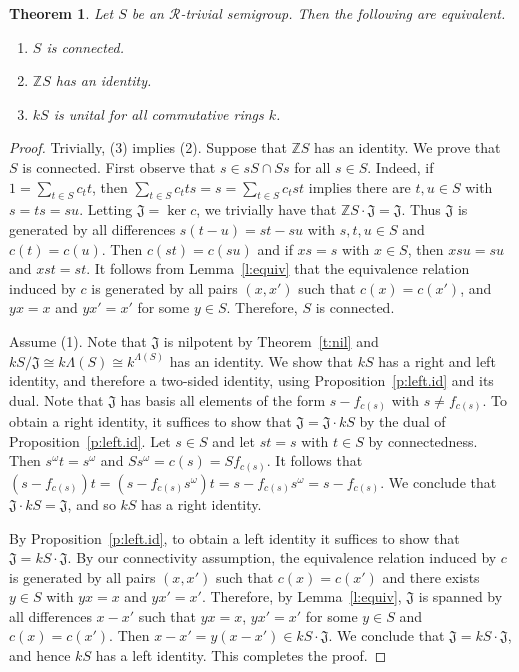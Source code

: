 \documentclass[reqno,11pt]{amsart}
\newcommand{\R}{\mathrel{\mathscr R}} %
\newtheorem{Thm}{Theorem}[section]
\numberwithin{equation}{section}
\begin{document}
\begin{Thm}\label{t:right.connected}
Let $S$ be an $\R$-trivial semigroup.  Then the following are equivalent.
\begin{enumerate}
    \item $S$ is connected.
    \item $\mathbb ZS$ has an identity.
    \item $kS$ is unital for all commutative rings $k$.
\end{enumerate}
\end{Thm}
\begin{proof}
Trivially, (3) implies (2).  Suppose that $\mathbb ZS$ has an identity.   We prove that $S$ is  connected. First observe that $s\in sS\cap Ss$ for all $s\in S$.  Indeed, if $1=\sum_{t\in S}c_tt$, then $\sum_{t\in S}c_tts=s=\sum_{t\in S}c_tst$ implies there are $t,u\in S$ with $s=ts=su$.   Letting $\mathfrak J=\ker c$, we trivially have that $\mathbb ZS\cdot \mathfrak J = \mathfrak J$. %
Thus $\mathfrak J$ is generated by all differences $s(t-u)=st-su$ with $s,t,u\in S$ and $c(t)=c(u)$. Then $c(st)=c(su)$ and if $xs=s$ with $x\in S$, then $xsu= su$ and $xst=st$.
  It follows from Lemma~\ref{l:equiv} that the equivalence relation induced by $c$ is generated by all pairs $(x,x')$ such that $c(x)=c(x')$, and $yx=x$ and $yx'=x'$ for some $y\in S$.  Therefore, $S$ is connected.

Assume (1). Note that %
$\mathfrak J$ is nilpotent by Theorem~\ref{t:nil} and $kS/\mathfrak J\cong k\Lambda(S)\cong k^{\Lambda(S)}$ has an identity. 
We show that $kS$ has a right and left identity, and therefore a two-sided identity, using Proposition~\ref{p:left.id} and its dual.    Note that $\mathfrak J$ has basis all elements of the form $s-f_{c(s)}$ with $s\neq f_{c(s)}$.   To obtain a right identity, it suffices to show that $\mathfrak J= \mathfrak J\cdot kS$ by the dual of Proposition~\ref{p:left.id}.  Let $s\in S$ and let $st=s$ with $t\in S$ by connectedness.  Then $s^\omega t =s^\omega$ and $Ss^{\omega} = c(s) = Sf_{c(s)}$.  It follows that $(s-f_{c(s)})t = (s-f_{c(s)}s^\omega)t = s-f_{c(s)}s^\omega=s-f_{c(s)}$.  We conclude that $\mathfrak J\cdot kS=\mathfrak J$, and so $kS$ has a right identity. 

 By Proposition~\ref{p:left.id}, to obtain a left identity it suffices to show that $\mathfrak J=kS\cdot \mathfrak J$.  By our connectivity assumption, the equivalence relation induced by $c$ is generated by all pairs $(x,x')$ such that $c(x)=c(x')$ and there exists $y\in S$ with $yx=x$ and $yx'=x'$.  Therefore, by Lemma~\ref{l:equiv}, $\mathfrak J$ is spanned by all differences $x-x'$ such that $yx=x$, $yx'=x'$ for some $y\in S$ and  $c(x)=c(x')$.  Then $x-x'=y(x-x')\in kS\cdot \mathfrak J$.  We conclude that $\mathfrak J=kS\cdot \mathfrak J$, and hence $kS$ has a left identity.  This completes the proof.
\end{proof}
\end{document}
